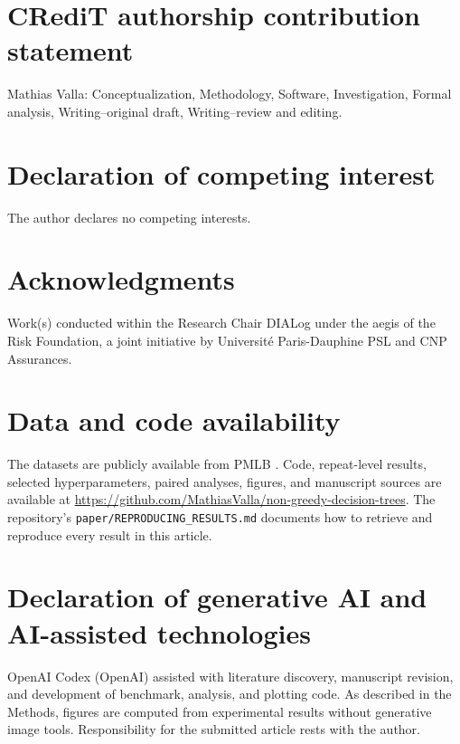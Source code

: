 \documentclass[final,5p,times]{elsarticle}
\begin{document}
\section*{CRediT authorship contribution statement}
Mathias Valla: Conceptualization, Methodology, Software, Investigation, Formal analysis, Writing--original draft, Writing--review and editing.
\section*{Declaration of competing interest}
The author declares no competing interests.
\section*{Acknowledgments}
Work(s) conducted within the Research Chair DIALog under the aegis of the Risk Foundation, a joint initiative by Universit{\'e} Paris-Dauphine PSL and CNP Assurances.
\section*{Data and code availability}
The datasets are publicly available from PMLB \cite{olson2017pmlb}. Code, repeat-level results, selected hyperparameters, paired analyses, figures, and manuscript sources are available at \url{https://github.com/MathiasValla/non-greedy-decision-trees}. The repository's \texttt{paper/REPRODUCING\_RESULTS.md} documents how to retrieve and reproduce every result in this article.
\section*{Declaration of generative AI and AI-assisted technologies}
OpenAI Codex (OpenAI) assisted with literature discovery, manuscript revision, and development of benchmark, analysis, and plotting code. As described in the Methods, figures are computed from experimental results without generative image tools. Responsibility for the submitted article rests with the author.
\end{document}
